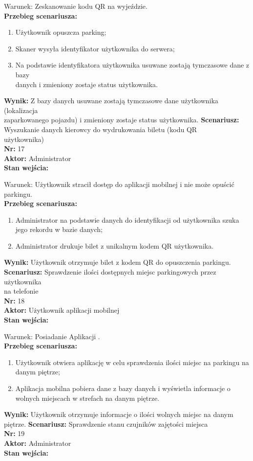 \documentclass[12pt,a4paper]{article}
\begin{document}
Warunek: Zeskanowanie kodu QR na wyjeździe.
\\{\bf Przebieg scenariusza:}
\begin{enumerate}
\item Użytkownik opuszcza parking;
\item Skaner wysyła identyfikator użytkownika do serwera;
\item Na podstawie identyfikatora użytkownika usuwane zostają tymczasowe dane z bazy\\danych i zmieniony zostaje status użytkownika.
\end{enumerate}
{\bf Wynik:} Z bazy danych usuwane zostają tymczasowe dane użytkownika (lokalizacja\\zaparkowanego pojazdu) i zmieniony zostaje status użytkownika.
\newline\newline
{\large \bf Scenariusz:} Wyszukanie danych kierowcy do wydrukowania biletu (kodu QR\\użytkownika)
\\{\bf Nr:} 17
\\{\bf Aktor:} Administrator
\\{\bf Stan wejścia:}

Warunek: Użytkownik stracił dostęp do aplikacji mobilnej i nie może opuścić parkingu.
\\{\bf Przebieg scenariusza:}
\begin{enumerate}
\item Administrator na podstawie danych do identyfikacji od użytkownika szuka jego rekordu w bazie danych;
\item Administrator drukuje bilet z unikalnym kodem QR użytkownika.
\end{enumerate}
{\bf Wynik:} Użytkownik otrzymuje bilet z kodem QR do opuszczenia parkingu.
\newline\newline
{\large \bf Scenariusz:} Sprawdzenie ilości dostępnych miejsc parkingowych przez użytkownika\\na telefonie
\\{\bf Nr:} 18
\\{\bf Aktor:} Użytkownik aplikacji mobilnej
\\{\bf Stan wejścia:}

Warunek: Posiadanie Aplikacji .
\\{\bf Przebieg scenariusza:}
\begin{enumerate}
\item Użytkownik otwiera aplikację w celu sprawdzenia ilości miejsc na parkingu na danym piętrze;
\item Aplikacja mobilna pobiera dane z bazy danych i wyświetla informacje o wolnych miejscach w strefach na danym piętrze.
\end{enumerate}
{\bf Wynik:} Użytkownik otrzymuje informacje o ilości wolnych miejsc na danym piętrze.
\newline\newline
{\large \bf Scenariusz:} Sprawdzenie stanu czujników zajętości miejsca
\\{\bf Nr:} 19
\\{\bf Aktor:} Administrator
\\{\bf Stan wejścia:}
\end{document}
